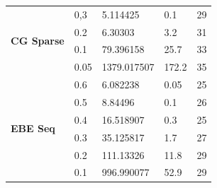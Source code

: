 \documentclass[
    12pt,               %
    openright,          %
    oneside,
    a4paper,            %
    english,            %
    french,             %
    spanish,            %
    brazil              %
    ]{abntex2}
\begin{document}
\begin{table}[]
\begin{tabular}{|l|l|l|l|l|}
		\multirow{4}{*}{\textbf{CG Sparse}}     & 0,3           & 5.114425           & 0.1                 & 29             \\ \cline{2-5} 
		& 0.2           & 6.30303            & 3.2                 & 31             \\ \cline{2-5} 
		& 0.1           & 79.396158          & 25.7                & 33             \\ \cline{2-5} 
		& 0.05          & 1379.017507        & 172.2               & 35             \\ \hline
		\multirow{6}{*}{\textbf{EBE Seq}}       & 0.6           & 6.082238           & 0.05                & 25             \\ \cline{2-5} 
		& 0.5           & 8.84496            & 0.1                 & 26             \\ \cline{2-5} 
		& 0.4           & 16.518907          & 0.3                 & 25             \\ \cline{2-5} 
		& 0.3           & 35.125817          & 1.7                 & 27             \\ \cline{2-5} 
		& 0.2           & 111.13326          & 11.8                & 29             \\ \cline{2-5} 
		& 0.1           & 996.990077         & 52.9                & 29             \\ \hline
	\end{tabular}
\end{table}



\postextual


%

\end{document}
